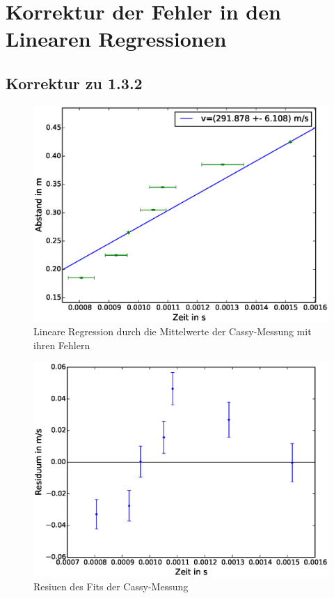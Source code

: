 \documentclass[12pt,a4paper]{article}
\author{Gruppe C14 \\ Julián Häck, Martin Koytek, Lars Wenning, Erik Zimmermann}
\begin{document}
\section{Korrektur der Fehler in den Linearen Regressionen}
\subsection{Korrektur zu 1.3.2}
\begin{figure}[H]
\centering
\includegraphics[scale=0.7]{Bilder/Linreg-cassy-laufzeit.eps}
\caption{Lineare Regression durch die Mittelwerte der Cassy-Messung mit ihren Fehlern}
\end{figure}
\begin{figure}[H]
\centering
\includegraphics[scale=0.7]{Bilder/Residuum-cassy-Laufzeit.eps}
\caption{Resiuen des Fits der Cassy-Messung}
\end{figure}
\end{document}
